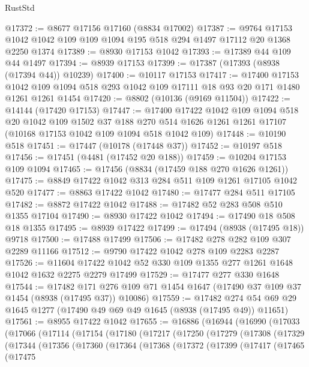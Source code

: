 \begin{lexlean}{RustStd}
\begin{coremodule}
@17372 := @8677 @17156 @17160 (@8834 @17002)
@17387 := @9764 @17153 @1042 @1042 @109 @109 @1094 @195 @518 @294 @1497 @17112 @20 @1368 @2250 @1374
@17389 := @8930 @17153 @1042
@17393 := @17389 @44 @109 @44 @1497
@17394 := @8939 @17153
@17399 := @17387 (@17393 (@8938 (@17394 @44)) @10239)
@17400 := @10117 @17153
@17417 := @17400
    @17153
    @1042
    @109
    @1094
    @518
    @293
    @1042
    @109
    @17111
    @18
    @93
    @20
    @171
    @1480
    @1261
    @1261
    @1454
@17420 := @8802 (@10136 (@9169 @11504))
@17422 := @14144 (@17420 @17153)
@17447 := @17400
    @17422
    @1042
    @109
    @1094
    @518
    @20
    @1042
    @109
    @1502
    @37
    @188
    @270
    @514
    @1626
    @1261
    @1261
    @17107
    (@10168 @17153 @1042 @109 @1094 @518 @1042 @109)
@17448 := @10190 @518
@17451 := @17447 (@10178 (@17448 @37))
@17452 := @10197 @518
@17456 := @17451 (@4481 (@17452 @20 @188))
@17459 := @10204 @17153 @109 @1094
@17465 := @17456 (@8834 (@17459 @188 @270 @1626 @1261))
@17475 := @8849 @17422 @1042 @313 @284 @511 @109 @1261 @17105 @1042 @520
@17477 := @8863 @17422 @1042
@17480 := @17477 @284 @511 @17105
@17482 := @8872 @17422 @1042
@17488 := @17482 @52 @283 @508 @510 @1355 @17104
@17490 := @8930 @17422 @1042
@17494 := @17490 @18 @508 @18 @1355
@17495 := @8939 @17422
@17499 := @17494 (@8938 (@17495 @18)) @9718
@17500 := @17488 @17499
@17506 := @17482 @278 @282 @109 @307 @2289 @11166
@17512 := @9790 @17422 @1042 @278 @109 @2283 @2287
@17526 := @11604 @17422 @1042 @52 @330 @109 @1355 @277 @1261 @1648 @1042 @1632 @2275 @2279 @17499
@17529 := @17477 @277 @330 @1648
@17544 := @17482
    @171
    @276
    @109
    @71
    @1454
    @1647
    (@17490 @37 @109 @37 @1454 (@8938 (@17495 @37)) @10086)
@17559 := @17482 @274 @54 @69 @29 @1645 @1277 (@17490 @49 @69 @49 @1645 (@8938 (@17495 @49)) @11651)
@17561 := @8955 @17422 @1042
@17655 := @16886
    (@16944
      (@16990
        (@17033
          (@17066
            (@17114
              (@17154
                (@17180
                  (@17217
                    (@17250
                      (@17279
                        (@17308
                          (@17329
                            (@17344
                              (@17356
                                (@17360
                                  (@17364
                                    (@17368
                                      (@17372
                                        (@17399
                                          (@17417
                                            (@17465
                                              (@17475

\end{coremodule}
\end{lexlean}
